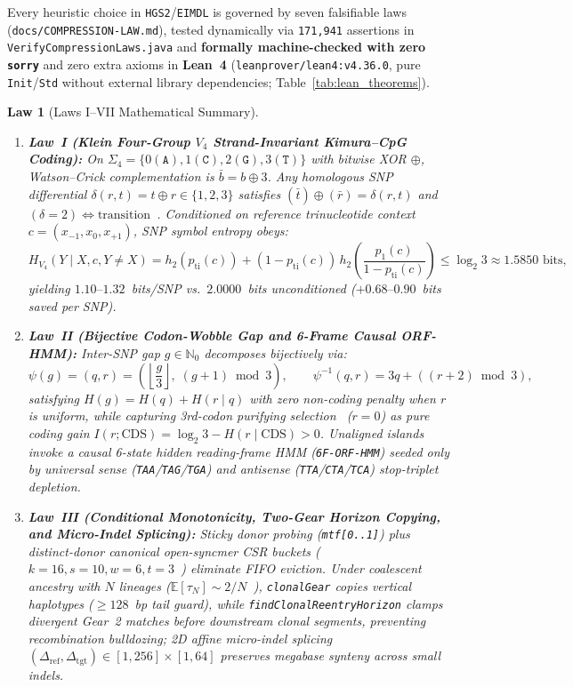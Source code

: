 \documentclass[10pt]{article}
\newtheorem{law}{Law}
\begin{document}
Every heuristic choice in \texttt{HGS2}/\texttt{EIMDL} is governed by seven falsifiable laws (\texttt{docs/COMPRESSION-LAW.md}), tested dynamically via \texttt{171,941} assertions in \texttt{VerifyCompressionLaws.java} and \textbf{formally machine-checked with zero \texttt{sorry}} and zero extra axioms in \textbf{Lean~4} (\texttt{leanprover/lean4:v4.36.0}, pure \texttt{Init}/\texttt{Std} without external library dependencies; Table~\ref{tab:lean_theorems}).

\begin{law}[Laws I--VII Mathematical Summary]
\begin{enumerate}
  \item \textbf{Law~I (Klein Four-Group $V_4$ Strand-Invariant Kimura--CpG Coding):} On $\Sigma_4 = \{0(\texttt{A}), 1(\texttt{C}), 2(\texttt{G}), 3(\texttt{T})\}$ with bitwise XOR $\oplus$, Watson--Crick complementation is $\bar{b} = b \oplus 3$. Any homologous SNP differential $\delta(r, t) = t \oplus r \in \{1, 2, 3\}$ satisfies $(\bar{t}) \oplus (\bar{r}) = \delta(r, t)$ and $(\delta = 2) \iff \text{transition}$~\cite{kimura1980simple}. Conditioned on reference trinucleotide context $c=(x_{-1},x_0,x_{+1})$, SNP symbol entropy obeys:
  \begin{equation}
    H_{V_4}(Y \mid X, c, Y \neq X) = h_2(p_{\text{ti}}(c)) + (1 - p_{\text{ti}}(c))\, h_2\!\left(\frac{p_1(c)}{1 - p_{\text{ti}}(c)}\right) \le \log_2 3 \approx 1.5850\text{ bits},
  \end{equation}
  yielding $1.10\text{--}1.32$~bits/SNP vs.\ $2.0000$~bits unconditioned ($+0.68\text{--}0.90$~bits saved per SNP).
  \item \textbf{Law~II (Bijective Codon-Wobble Gap and 6-Frame Causal ORF-HMM):} Inter-SNP gap $g \in \mathbb{N}_0$ decomposes bijectively via:
  \begin{equation}
    \psi(g) = (q, r) = \left(\left\lfloor \frac{g}{3} \right\rfloor,\; (g+1) \bmod 3\right), \qquad \psi^{-1}(q, r) = 3q + ((r+2) \bmod 3),
  \end{equation}
  satisfying $H(g) = H(q) + H(r \mid q)$ with zero non-coding penalty when $r$ is uniform, while capturing 3rd-codon purifying selection~\cite{crick1966codon} ($r=0$) as pure coding gain $I(r; \text{CDS}) = \log_2 3 - H(r \mid \text{CDS}) > 0$. Unaligned islands invoke a causal 6-state hidden reading-frame HMM (\texttt{6F-ORF-HMM}) seeded only by universal sense (\texttt{TAA}/\texttt{TAG}/\texttt{TGA}) and antisense (\texttt{TTA}/\texttt{CTA}/\texttt{TCA}) stop-triplet depletion.
  \item \textbf{Law~III (Conditional Monotonicity, Two-Gear Horizon Copying, and Micro-Indel Splicing):} Sticky donor probing (\texttt{mtf[0..1]}) plus distinct-donor canonical open-syncmer CSR buckets ($k=16, s=10, w=6, t=3$~\cite{edgar2021syncmers}) eliminate FIFO eviction. Under coalescent ancestry with $N$ lineages ($\mathbb{E}[\tau_N] \sim 2/N$~\cite{li2003relating}), \texttt{clonalGear} copies vertical haplotypes ($\ge 128$~bp tail guard), while \texttt{findClonalReentryHorizon} clamps divergent Gear~2 matches before downstream clonal segments, preventing recombination bulldozing; 2D affine micro-indel splicing $(\Delta_{\text{ref}}, \Delta_{\text{tgt}}) \in [1,256]\times[1,64]$ preserves megabase synteny across small indels.

\end{enumerate}
\end{law}
\end{document}
